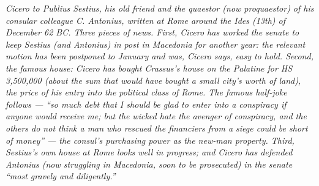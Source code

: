 
\textit{Cicero to Publius Sestius, his old friend and the
quaestor (now proquaestor) of his consular colleague C.
Antonius, written at Rome around the Ides (13th) of
December 62 BC. Three pieces of news. First, Cicero has
worked the senate to keep Sestius (and Antonius) in
post in Macedonia for another year: the relevant motion
has been postponed to January and was, Cicero says, easy
to hold. Second, the famous house: Cicero has bought
Crassus's house on the Palatine for HS 3,500,000 (about
the sum that would have bought a small city's worth of
land), the price of his entry into the political class
of Rome. The famous half-joke follows --- ``so much debt
that I should be glad to enter into a conspiracy if
anyone would receive me; but the wicked hate the avenger
of conspiracy, and the others do not think a man who
rescued the financiers from a siege could be short of
money'' --- the consul's purchasing power as the new-man
property. Third, Sestius's own house at Rome looks well
in progress; and Cicero has defended Antonius (now
struggling in Macedonia, soon to be prosecuted) in the
senate ``most gravely and diligently.''}
